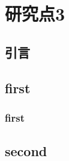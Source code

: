 \chapter{研究点3}\label{chap:chap3}

\section{引言}

\section{first}

\subsection{first}

\section{second}